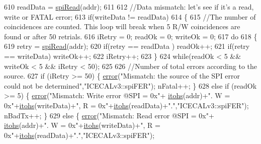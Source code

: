 \begin{DoxyCode}
610             readData = \hyperlink{classICECALv3_aced41ce20a0853d6248b8df88412e57a}{spiRead}(addr);    
611 
612             \textcolor{comment}{//Data mismatch: let's see if it's a read, write or FATAL error;}
613             \textcolor{keywordflow}{if}(writeData != readData)
614             \{
615                 \textcolor{comment}{//The number of coincidences are counted. This loop will break when 5 R/W coincidences are
       found or after 50 retrials.}
616                 iRetry = 0;     readOk = 0;         writeOk = 0;
617                 \textcolor{keywordflow}{do}
618                 \{
619                     retry = \hyperlink{classICECALv3_aced41ce20a0853d6248b8df88412e57a}{spiRead}(addr);
620                     \textcolor{keywordflow}{if}(retry == readData )  readOk++;
621                     \textcolor{keywordflow}{if}(retry == writeData) writeOk++;
622                     iRetry++;
623                 \}
624                 \textcolor{keywordflow}{while}(readOk < 5 && writeOk < 5 && iRetry < 50);
625 
626                 \textcolor{comment}{//Number of total errors according to the source.}
627                 \textcolor{keywordflow}{if}          (iRetry >= 50) \{    \hyperlink{classObject_a204a95f57818c0f811933917a30eff45}{error}(\textcolor{stringliteral}{"Mismatch: the source of the SPI error could not
       be determined"},\textcolor{stringliteral}{"ICECALv3::spiFER"});     nFatal++;   \}
628                 \textcolor{keywordflow}{else} \textcolor{keywordflow}{if} (readOk >= 5)    \{  \hyperlink{classObject_a204a95f57818c0f811933917a30eff45}{error}(\textcolor{stringliteral}{"Mismatch: Write error @SPI = 0x"}+
      \hyperlink{classICECALv3_a04b02e583f191bfce34d05132cd23834}{itohs}(addr)+\textcolor{stringliteral}{". W = 0x"}+\hyperlink{classICECALv3_a04b02e583f191bfce34d05132cd23834}{itohs}(writeData)+\textcolor{stringliteral}{", R = 0x"}+\hyperlink{classICECALv3_a04b02e583f191bfce34d05132cd23834}{itohs}(readData)+\textcolor{stringliteral}{"."},\textcolor{stringliteral}{"ICECALv3::spiFER"});  
      nBadTx++;    \}
629                 \textcolor{keywordflow}{else}                                     \{  \hyperlink{classObject_a204a95f57818c0f811933917a30eff45}{error}(\textcolor{stringliteral}{"Mismatch: Read error @SPI = 0x"}+
      \hyperlink{classICECALv3_a04b02e583f191bfce34d05132cd23834}{itohs}(addr)+\textcolor{stringliteral}{".  W = 0x"}+\hyperlink{classICECALv3_a04b02e583f191bfce34d05132cd23834}{itohs}(writeData)+\textcolor{stringliteral}{", R = 0x"}+\hyperlink{classICECALv3_a04b02e583f191bfce34d05132cd23834}{itohs}(readData)+\textcolor{stringliteral}{"."},\textcolor{stringliteral}{"ICECALv3::spiFER"});     

\end{DoxyCode}
